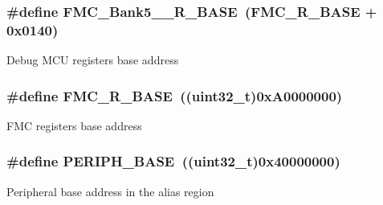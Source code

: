 \subsubsection[{\texorpdfstring{F\+M\+C\+\_\+\+Bank5\+\_\+6\+\_\+\+R\+\_\+\+B\+A\+SE}{FMC_Bank5_6_R_BASE}}]{\setlength{\rightskip}{0pt plus 5cm}\#define F\+M\+C\+\_\+\+Bank5\+\_\+\_\+\+R\+\_\+\+B\+A\+SE~({\bf F\+M\+C\+\_\+\+R\+\_\+\+B\+A\+SE} + 0x0140)}\hypertarget{group___peripheral__memory__map_gace117149a4fc0d07c38cc997fe4c4a73}{}\label{group___peripheral__memory__map_gace117149a4fc0d07c38cc997fe4c4a73}
Debug M\+CU registers base address 
\subsubsection[{\texorpdfstring{F\+M\+C\+\_\+\+R\+\_\+\+B\+A\+SE}{FMC_R_BASE}}]{\setlength{\rightskip}{0pt plus 5cm}\#define F\+M\+C\+\_\+\+R\+\_\+\+B\+A\+SE~((uint32\+\_\+t)0x\+A0000000)}\hypertarget{group___peripheral__memory__map_ga7a599164cd92798542bc6288793d1ed5}{}\label{group___peripheral__memory__map_ga7a599164cd92798542bc6288793d1ed5}
F\+MC registers base address 
\subsubsection[{\texorpdfstring{P\+E\+R\+I\+P\+H\+\_\+\+B\+A\+SE}{PERIPH_BASE}}]{\setlength{\rightskip}{0pt plus 5cm}\#define P\+E\+R\+I\+P\+H\+\_\+\+B\+A\+SE~((uint32\+\_\+t)0x40000000)}\hypertarget{group___peripheral__memory__map_ga9171f49478fa86d932f89e78e73b88b0}{}\label{group___peripheral__memory__map_ga9171f49478fa86d932f89e78e73b88b0}
Peripheral base address in the alias region 
